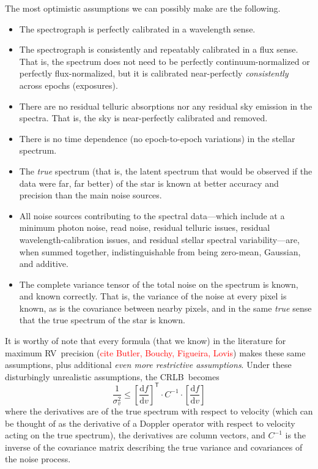 \documentclass[modern]{aastex61}
\newcommand{\dd}{\mathrm{d}}
\newcommand{\T}{^{\mathsf{T}}}
\newcommand{\todo}[1]{\textcolor{red}{#1}}  %
\newcommand{\acronym}[1]{{\small{#1}}}
\newcommand{\RV}{\acronym{RV}}
\newcommand{\CRLB}{\acronym{CRLB}}
\begin{document}
The most optimistic assumptions we can possibly make are the following.
\begin{itemize}
\item The spectrograph is perfectly calibrated in a wavelength sense.
\item The spectrograph is consistently and repeatably calibrated in a
  flux sense. That is, the spectrum does not need to be perfectly
  continuum-normalized or perfectly flux-normalized, but it is
  calibrated near-perfectly \emph{consistently} across epochs (exposures).
\item There are no residual telluric absorptions nor any residual sky
  emission in the spectra. That is, the sky is near-perfectly calibrated
  and removed.
\item There is no time dependence (no epoch-to-epoch variations) in the
  stellar spectrum.
\item The \emph{true} spectrum (that is, the latent spectrum that
  would be observed if the data were far, far better) of the star is
  known at better accuracy and precision than the main noise sources.
\item All noise sources contributing to the spectral data---which
  include at a minimum photon noise, read noise, residual telluric
  issues, residual wavelength-calibration issues, and residual stellar
  spectral variability---are, when summed together, indistinguishable
  from being zero-mean, Gaussian, and additive.
\item The complete variance tensor of the total noise on the spectrum is known, and
  known correctly. That is, the variance of the noise at every pixel
  is known, as is the covariance between nearby pixels, and in the
  same \emph{true} sense that the true spectrum of the star is known.
\end{itemize}
It is worthy of note that every formula (that we know) in the
literature for maximum \RV\ precision (\todo{cite Butler, Bouchy,
  Figueira, Lovis}) makes these same assumptions, plus additional \emph{even
more restrictive assumptions}.
Under these disturbingly unrealistic assumptions, the \CRLB\ becomes
\begin{equation}\label{eq:crlb}
\frac{1}{\sigma_v^2} \leq \left[\frac{\dd f}{\dd v}\right]\T\cdot C^{-1}\cdot\left[\frac{\dd f}{\dd v}\right]
\end{equation}
where the derivatives are of the true spectrum with respect to
velocity (which can be thought of as the derivative of a Doppler
operator with respect to velocity acting on the true spectrum), the
derivatives are column vectors, and $C^{-1}$ is the inverse of the covariance matrix
describing the true variance and covariances of the noise process.
\end{document}
